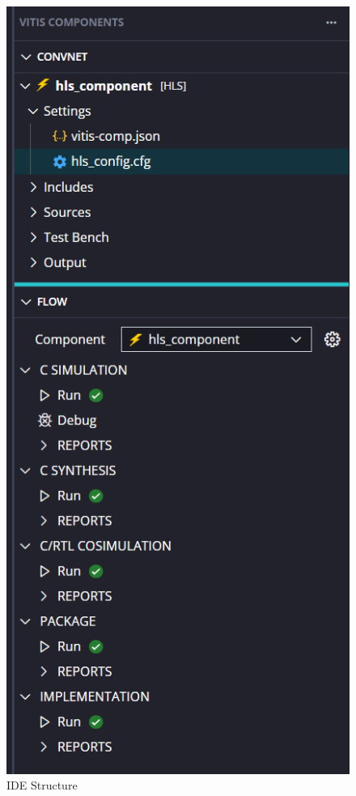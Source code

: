 \documentclass{article}
\begin{document}
\begin{figure}[H]
\begin{minipage}{0.4\textwidth}
        \includegraphics[width=\textwidth]{assets/IDE-structure.png}
        \caption{IDE Structure}
        \label{fig:ide_structure}
    \end{minipage}
\end{figure}
\end{document}

